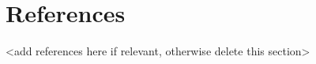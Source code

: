 \documentclass[
  12pt,
]{article}
\begin{document}
\newpage

\hypertarget{references}{%
\section{References}\label{references}}

\textless add references here if relevant, otherwise delete this
section\textgreater{}
\end{document}
